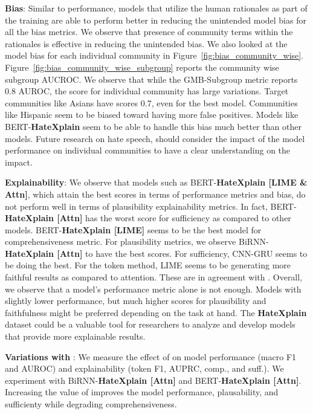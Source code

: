 \documentclass[letterpaper]{article} \usepackage{aaai21}  \usepackage{times}  \usepackage{helvet} \usepackage{courier}  \usepackage[hyphens]{url}  \usepackage{graphicx} \urlstyle{rm} \def\UrlFont{\rm}  \usepackage{natbib}  \usepackage{caption}
\begin{document}
\noindent\textbf{Bias}: Similar to performance, models that utilize the human rationales as part of the training are able to perform better in reducing the unintended model bias for all the bias metrics. We observe that presence of community terms within the rationales is effective in reducing the unintended bias.
We also looked at the model bias for each individual community in Figure~\ref{fig:bias_community_wise}. 
Figure~\ref{fig:bias_community_wise_subgroup} reports the community wise subgroup AUCROC. We observe that while the GMB-Subgroup metric reports 0.8 AUROC, the score for individual community has large variations. Target communities like Asians have scores 0.7, even for the best model. Communities like Hispanic seem to be biased toward having more false positives. Models like BERT-\textbf{HateXplain} seem to be able to handle this bias much better than other models. Future research on hate speech, should consider the impact of the model performance on individual communities to have a clear understanding on the impact.




\noindent\textbf{Explainability}: We observe that models such as BERT-{\bf{HateXplain} [LIME \& Attn]}, which attain the best scores in terms of performance metrics and bias, do not perform well in terms of plausibility explainability metrics. In fact, BERT-{\bf{HateXplain} [Attn]} has the worst score for sufficiency as compared to other models. BERT-{\bf{HateXplain} [LIME]} seems to be the best model for comprehensiveness metric. 
For plausibility metrics, we observe BiRNN-{\bf{HateXplain} [Attn]} to have the best scores. For sufficiency, CNN-GRU seems to be doing the best. For the token method, LIME seems to be generating more faithful results as compared to attention. These are in agreement with \citet{deyoung2019eraser}. Overall, we observe that a model's performance metric alone is not enough. Models with slightly lower performance, but much higher scores for plausibility and faithfulness might be preferred depending on the task at hand. The \textbf{HateXplain} dataset could be a valuable tool for researchers to analyze and develop models that provide more explainable results. 

\noindent\textbf{Variations with }: We measure the effect of  on model performance (macro F1 and AUROC) and explainability (token F1, AUPRC, comp., and suff.). We experiment with BiRNN-{\bf{HateXplain} [Attn]} and BERT-{\bf{HateXplain} [Attn]}. Increasing the value of  improves the model performance, plausability, and sufficienty while degrading comprehensiveness.
\end{document}
